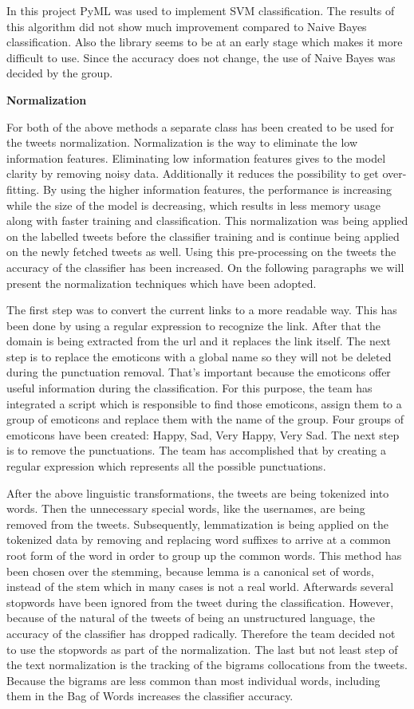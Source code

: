 In this project PyML\cite{website:pyml} was used to implement SVM
classification. The results of this algorithm did not show much improvement
compared to Naive Bayes classification. Also the library seems to be at an
early stage which makes it more difficult to use. Since the accuracy does not
change, the use of Naive Bayes was decided by the group.

\textbf{Normalization}

For both of the above methods a separate class has been created to be used for the tweets normalization. Normalization is the way to eliminate the low information features. Eliminating low information features gives to the model clarity by removing noisy data. Additionally it reduces the possibility to get over-fitting. By using the higher information features, the performance is increasing while the size of the model is decreasing, which results in less memory usage along with faster training and classification. This normalization was being applied on the labelled tweets before the classifier training and is continue being applied on the newly fetched tweets as well. Using this pre-processing on the tweets the accuracy of the classifier has been increased. On the following paragraphs we will present the normalization techniques which have been adopted. 

The first step was to convert the current links to a more readable way. This has been done by using a regular expression to recognize the link. After that the domain is being extracted from the url and it replaces the link itself. The next step is to replace the emoticons with a global name so they will not be deleted during the punctuation removal. That’s important because the emoticons offer useful information during the classification. For this purpose, the team has integrated a script which is responsible to find those emoticons, assign them to a group of emoticons and replace them with the name of the group. Four groups of emoticons have been created: Happy, Sad, Very Happy, Very Sad. The next step is to remove the punctuations. The team has accomplished that by creating a regular expression which represents all the possible punctuations. 

After the above linguistic transformations, the tweets are being tokenized into words. Then the unnecessary special words, like the usernames, are being removed from the tweets. Subsequently, lemmatization is being applied on the tokenized data by removing and replacing word suffixes to arrive at a common root form of the word in order to group up the common words. This method has been chosen over the stemming, because lemma is a canonical set of words, instead of the stem which in many cases is not a real world. Afterwards several stopwords have been ignored from the tweet during the classification. However, because of the natural of the tweets of being an unstructured language, the accuracy of the classifier has dropped radically. Therefore the team decided not to use the stopwords as part of the normalization. The last but not least step of the text normalization is the tracking of the bigrams collocations from the tweets. Because the bigrams are less common than most individual words, including them in the Bag of Words increases the classifier accuracy.

